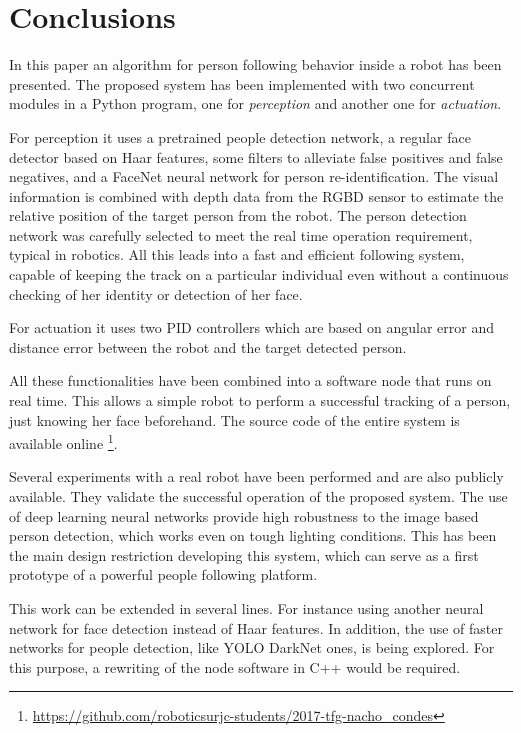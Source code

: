 \section{Conclusions}

In this paper an algorithm for person following behavior inside a robot has been presented. 
The proposed system has been implemented with two concurrent modules in a Python program, one for \emph{perception} and another one for \emph{actuation}. 

For perception it uses a pretrained people detection network, a regular face detector based on Haar features, some filters to alleviate false positives and false negatives, and a FaceNet neural network for person re-identification. The visual information is combined with depth data from the RGBD sensor to estimate the relative position of the target person from the robot. The person detection network was carefully selected to meet the real time operation requirement, typical in robotics. All this leads into a fast and efficient following system, capable of keeping the track on a particular individual even without a continuous checking of her identity or detection of her face. 

For actuation it uses two PID controllers which are based on angular error and distance error between the robot and the target detected person.

All these functionalities have been combined into a software node that runs on real time. This allows a simple robot to perform a successful tracking of a person, just knowing her face beforehand. The source code of the entire system is available online \footnote{\url{https://github.com/roboticsurjc-students/2017-tfg-nacho_condes}}.

Several experiments with a real robot have been performed and are also publicly available. They validate the successful operation of the proposed system. The use of deep learning neural networks provide high robustness to the image based person detection, which works even on tough lighting conditions. This has been the main design restriction developing this system, which can serve as a first prototype of a powerful people following platform.


This work can be extended in several lines. For instance using another neural network for face detection instead of Haar features. In addition, the use of faster networks for people detection, like YOLO DarkNet ones, is being explored. For this purpose, a rewriting of the node software in C++ would be required.
